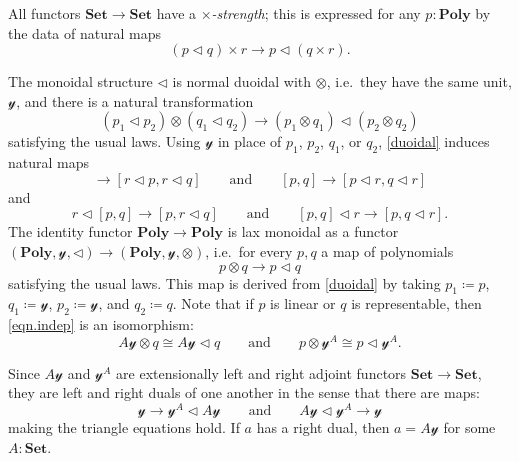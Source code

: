 \documentclass[11pt, one side, article]{memoir}
\theoremstyle{definition}
\theoremstyle{plain}
\newcommand{\Cat}[1]{\mathbf{#1}}%
\newcommand{\too}{\longrightarrow}
\newcommand{\smset}{\Cat{Set}}
\newcommand{\yon}{\mathcal{y}}
\newcommand{\poly}{\Cat{Poly}}
\newcommand{\0}{\textsf{0}}
\newcommand{\1}{\tn{\textsf{1}}}
\newcommand{\tri}{\mathbin{\triangleleft}}
\newcommand{\qqand}{\qquad\text{and}\qquad}
\begin{document}
All functors $\smset\to\smset$ have a \emph{$\times$-strength}; this is expressed for any $p:\poly$ by the data of natural maps
\begin{equation}
	(p\tri q)\times r\to p\tri(q\times r).
\end{equation}


The monoidal structure $\tri$ is normal duoidal with $\otimes$, i.e.\ they have the same unit, $\yon$, and there is a natural transformation
\begin{equation}\label{duoidal}
	(p_1\tri p_2)\otimes(q_1\tri q_2)\too(p_1\otimes q_1)\tri(p_2\otimes q_2)
\end{equation}
satisfying the usual laws. Using $\yon$ in place of $p_1$, $p_2$, $q_1$, or $q_2$, \eqref{duoidal} induces natural maps
\begin{equation}
	[p,q]\to[r\tri p, r\tri q]
	\qqand
	[p,q]\to[p\tri r, q\tri r]
\end{equation}
and
\begin{equation}
	r\tri[p,q]\to[p,r\tri q]
	\qqand
	[p,q]\tri r\to [p,q\tri r].
\end{equation}
The identity functor $\poly\to\poly$ is lax monoidal as a functor $(\poly,\yon,\tri)\to(\poly,\yon,\otimes)$, i.e.\ for every $p,q$ a map of polynomials
\begin{equation}\label{eqn.indep}
	p\otimes q\to p\tri q
\end{equation}
satisfying the usual laws. This map is derived from \eqref{duoidal} by taking $p_1\coloneqq p$, $q_1\coloneqq\yon$, $p_2\coloneqq\yon$, and $q_2\coloneqq q$. Note that if $p$ is linear or $q$ is representable, then \eqref{eqn.indep} is an isomorphism:
\begin{equation}
  A\yon\otimes q\cong A\yon\tri q
  \qqand
  p\otimes\yon^A\cong p\tri \yon^A.
\end{equation}

Since $A\yon$ and $\yon^A$ are extensionally left and right adjoint functors $\smset\to\smset$, they are left and right duals of one another in the sense that there are maps:
\begin{equation}
	\yon\to \yon^A\tri A\yon
	\qqand
	A\yon\tri\yon^A\to\yon
\end{equation}
making the triangle equations hold. If $a$ has a right dual, then $a=A\yon$ for some $A:\smset$.
\end{document}
